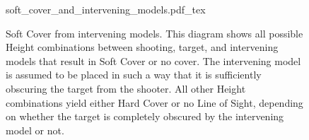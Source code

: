 
\begin{figure}[!phtb]
	\centering
	\def\svgwidth{\textwidth}
	{soft_cover_and_intervening_models.pdf_tex}
	\caption{Soft Cover from intervening models.\captionposttitle%
		This diagram shows all possible Height combinations between shooting, target, and intervening models that result in Soft Cover or no cover. The intervening model is assumed to be placed in such a way that it is sufficiently obscuring the target from the shooter. All other Height combinations yield either Hard Cover or no Line of Sight, depending on whether the target is completely obscured by the intervening model or not.%
	}
	\label{figure/soft_cover_and_intervening_models}
\end{figure}
